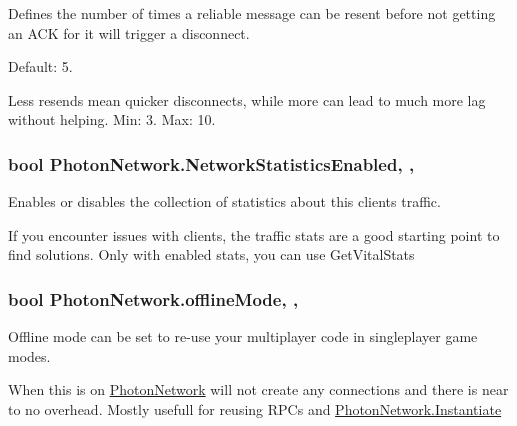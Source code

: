Defines the number of times a reliable message can be resent before not getting an A\+CK for it will trigger a disconnect. 

Default\+: 5.

Less resends mean quicker disconnects, while more can lead to much more lag without helping. Min\+: 3. Max\+: 10.
\subsubsection[{\texorpdfstring{Network\+Statistics\+Enabled}{NetworkStatisticsEnabled}}]{\setlength{\rightskip}{0pt plus 5cm}bool Photon\+Network.\+Network\+Statistics\+Enabled\hspace{0.3cm}{\ttfamily [static]}, {\ttfamily [get]}, {\ttfamily [set]}}\hypertarget{class_photon_network_a67cb40d5f2dede55b03b2be1f792e93a}{}\label{class_photon_network_a67cb40d5f2dede55b03b2be1f792e93a}


Enables or disables the collection of statistics about this client\textquotesingle{}s traffic. 

If you encounter issues with clients, the traffic stats are a good starting point to find solutions. Only with enabled stats, you can use Get\+Vital\+Stats 
\subsubsection[{\texorpdfstring{offline\+Mode}{offlineMode}}]{\setlength{\rightskip}{0pt plus 5cm}bool Photon\+Network.\+offline\+Mode\hspace{0.3cm}{\ttfamily [static]}, {\ttfamily [get]}, {\ttfamily [set]}}\hypertarget{class_photon_network_a4a1cd1887cb41a0592322527a7304ed7}{}\label{class_photon_network_a4a1cd1887cb41a0592322527a7304ed7}


Offline mode can be set to re-\/use your multiplayer code in singleplayer game modes. 

When this is on \hyperlink{class_photon_network}{Photon\+Network} will not create any connections and there is near to no overhead. Mostly usefull for reusing R\+PC\textquotesingle{}s and \hyperlink{class_photon_network_a843d9f62d28ab123c83291c1e6bb857d}{Photon\+Network.\+Instantiate} 
